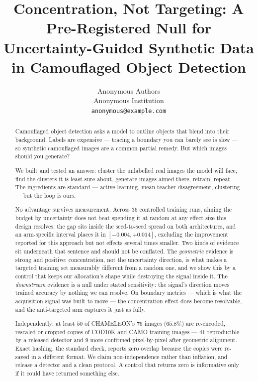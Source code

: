 \documentclass{article} %
\title{Concentration, Not Targeting: A Pre-Registered Null for\\
Uncertainty-Guided Synthetic Data in Camouflaged Object Detection}
\author{Anonymous Authors \\
Anonymous Institution \\
\texttt{anonymous@example.com}
}
\begin{document}
\maketitle

\begin{abstract}
Camouflaged object detection asks a model to outline objects that blend into their background.
Labels are expensive --- tracing a boundary you can barely see is slow --- so synthetic camouflaged
images are a common partial remedy. But which images should you generate?

We built and tested an answer: cluster the unlabelled real images the model will face, find the
clusters it is least sure about, generate images aimed there, retrain, repeat. The ingredients are
standard --- active learning, mean-teacher disagreement, clustering --- but the loop is ours.

No advantage survives measurement. Across $36$ controlled training runs, aiming the budget by
uncertainty does not beat spending it at random at any effect size this design resolves: the gap
sits inside the seed-to-seed spread on both architectures, and an arm-specific interval places it in
$[-0.004, +0.014]$, excluding the improvement reported for this approach but not effects several
times smaller. Two kinds of evidence sit underneath that sentence and should not be conflated. The
\emph{geometric} evidence is strong and positive: concentration, not the uncertainty direction, is
what makes a targeted training set measurably different from a random one, and we show this by a
control that keeps our allocation's shape while destroying the signal inside it. The
\emph{downstream} evidence is a null under stated sensitivity: the signal's direction moves trained
accuracy by nothing we can resolve. On boundary metrics --- which is what the acquisition signal was
built to move --- the concentration effect does become resolvable, and the anti-targeted arm captures
it just as fully.

Independently: at least $50$ of CHAMELEON's $76$ images ($65.8\%$) are re-encoded, rescaled or
cropped copies of COD10K and CAMO training images --- $41$ reproducible by a released detector and
$9$ more confirmed pixel-by-pixel after geometric alignment. Exact hashing, the standard check,
reports zero overlap because the copies were re-saved in a different format. We claim non-independence rather
than inflation, and release a detector and a clean protocol. A control that returns zero is
informative only if it could have returned something else.
\end{abstract}
\end{document}
